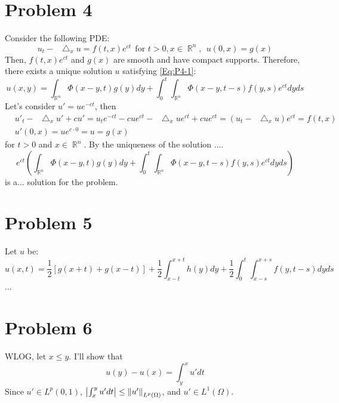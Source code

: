 \documentclass{article}
\DeclareMathOperator{\rr}{\mathbb{R}}
\newcommand*\Laplace{\mathop{}\!\mathbin\bigtriangleup}
\begin{document}
\section*{Problem 4}
Consider the following PDE:
\begin{equation}\label{Eq:P4-1}
u_t-\Laplace_x u=f(t,x)e^{ct}~~\text{for }t>0,x\in\rr^n,~~u(0,x)=g(x)
\end{equation}
Then, $f(t,x)e^{ct}$ and $g(x)$ are smooth and have compact supports. Therefore, there exists a unique solution $u$ satisfying \eqref{Eq:P4-1}:
\begin{equation*}
u(x,y)=\int_{\rr^n}\Phi(x-y,t)g(y)dy+\int_0^t\int_{\rr^n}\Phi(x-y,t-s)f(y,s)e^{ct}dyds
\end{equation*}
Let's consider $u'=ue^{-ct}$, then
\begin{equation*}
\begin{split}
&u'_t-\Laplace_x u'+cu'=u_te^{-ct}-cue^{ct}-\Laplace_x ue^{ct}+cue^{ct}=(u_t-\Laplace_x u)e^{ct}=f(t,x) \\
&u'(0,x)=ue^{c\cdot 0}=u=g(x)
\end{split}
\end{equation*}
for $t>0$ and $x\in \rr^n$. By the uniqueness of the solution ....
\begin{equation*}
e^{ct}\left(\int_{\rr^n}\Phi(x-y,t)g(y)dy+\int_0^t\int_{\rr^n}\Phi(x-y,t-s)f(y,s)e^{ct}dyds\right)
\end{equation*}
is a... solution for the problem.

\section*{Problem 5}
Let $u$ be:
\begin{equation}
u(x,t)=\frac{1}{2}[g(x+t)+g(x-t)]+\frac{1}{2}\int_{x-t}^{x+t} h(y)dy + \frac{1}{2}\int_0^t\int_{x-s}^{x+s}f(y, t-s)dyds 
\end{equation}
...

\section*{Problem 6}
WLOG, let $x\leq y$. I'll show that
\begin{equation*}
u(y)-u(x)=\int_y^x u' dt
\end{equation*}
Since $u'\in L^p(0, 1)$, $\abs{\int_x^y u' dt}\leq \norm{u'}_{L^p(\Omega)}$, and $u'\in L^1(\Omega)$.
\end{document}
